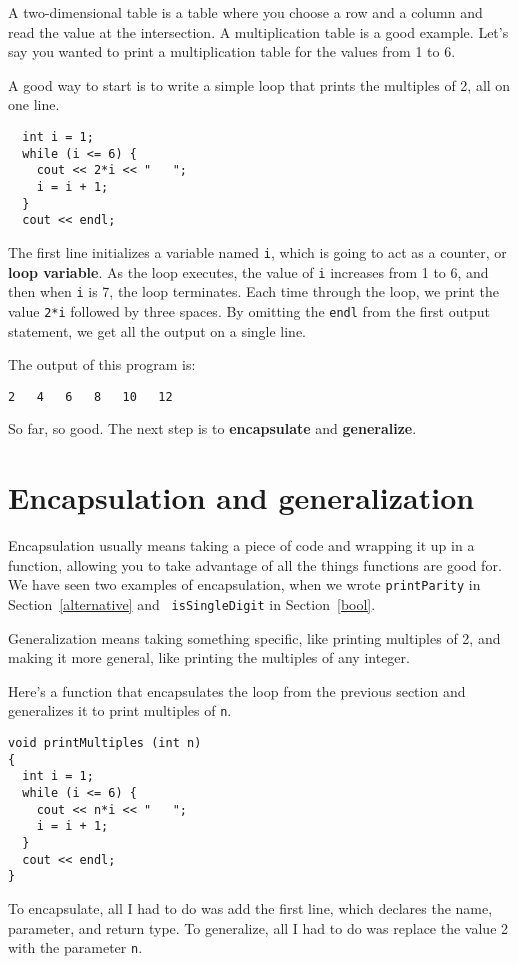 A two-dimensional table is a table where you choose a row and
a column and read the value at the intersection.  A multiplication
table is a good example.  Let's say you wanted to print a
multiplication table for the values from 1 to 6.

A good way to start is to write a simple loop that prints
the multiples of 2, all on one line.

\begin{verbatim}
  int i = 1;
  while (i <= 6) {
    cout << 2*i << "   ";
    i = i + 1;
  }
  cout << endl;
\end{verbatim}
%
The first line initializes a variable named {\tt i}, which is
going to act as a counter, or {\bf loop variable}.  As the
loop executes, the value of {\tt i} increases from 1 to 6,
and then when {\tt i} is 7, the loop terminates.  Each
time through the loop, we print the value {\tt 2*i} followed
by three spaces.  By omitting the {\tt endl} from the
first output statement, we get 
all the output on a single line.


The output of this program is:

\begin{verbatim}
2   4   6   8   10   12
\end{verbatim}
%
So far, so good.  The next step is to {\bf encapsulate} and {\bf
generalize}.

\section {Encapsulation and generalization}

Encapsulation usually means taking a piece of code and wrapping it up
in a function, allowing you to take advantage of all the things functions
are good for.  We have seen two examples of encapsulation, when we
wrote {\tt printParity} in Section~\ref{alternative} and {\tt
isSingleDigit} in Section~\ref{bool}.

Generalization means taking something specific, like printing
multiples of 2, and making it more general, like printing the
multiples of any integer.


Here's a function that encapsulates the loop from the previous
section and generalizes it to print multiples of {\tt n}.

\begin{verbatim}
void printMultiples (int n)
{
  int i = 1;
  while (i <= 6) {
    cout << n*i << "   ";
    i = i + 1;
  }
  cout << endl;
}
\end{verbatim}
%
To encapsulate, all I had to do was add the first line,
which declares the name, parameter,
and return type.  To generalize, all I had to do was replace
the value 2 with the parameter {\tt n}.

